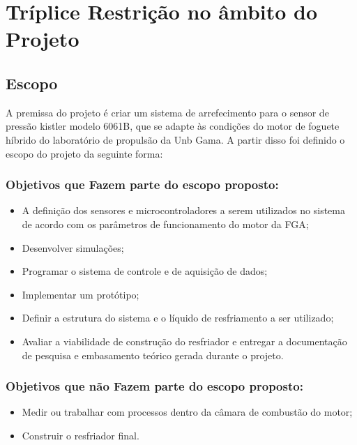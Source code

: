 \chapter{Tríplice Restrição no âmbito do Projeto}

\section{Escopo}

A premissa do projeto é criar um sistema de arrefecimento para o sensor de pressão kistler modelo 6061B, que se adapte às condições do motor de foguete híbrido do laboratório de propulsão da Unb Gama. A partir disso foi definido o escopo do projeto da seguinte forma:

\subsection{Objetivos que Fazem parte do escopo proposto:}

\begin{itemize}

	\item A definição dos sensores e microcontroladores a serem utilizados no sistema de acordo com os parâmetros de funcionamento do motor da FGA;

	\item Desenvolver simulações;

	\item Programar o sistema de controle e de aquisição de dados;

	\item Implementar um protótipo;

	\item Definir a estrutura do sistema e o líquido de resfriamento a ser utilizado;

	\item Avaliar a viabilidade de construção do resfriador e entregar a documentação de pesquisa e embasamento teórico gerada durante o projeto.

\end{itemize} 

\subsection{Objetivos que não Fazem parte do escopo proposto:}

\begin{itemize}
	\item Medir ou trabalhar com processos dentro da câmara de combustão do motor;
	\item Construir o resfriador final.

\end{itemize}

